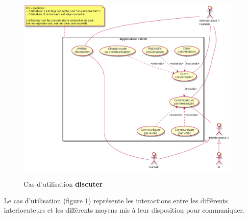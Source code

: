 \documentclass[11pt,dvipsnames,svgnames]{report}
\begin{document}
\begin{figure}[H]
\caption{Cas d'utilisation \textbf{discuter}}
\includegraphics[width=\linewidth]{images/uc-discuter.png}
\label{cas1}
\end{figure}
Le cas d'utilisation (figure \ref{cas1}) représente les interactions entre les différents interlocuteurs et les différents moyens mis à leur disposition pour communiquer.
\end{document}
